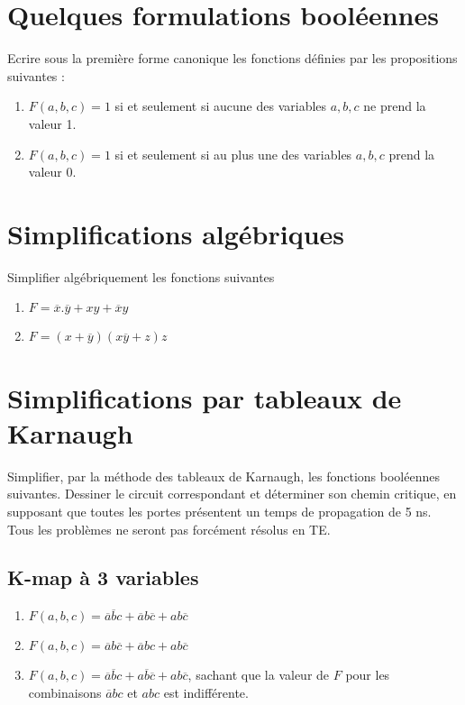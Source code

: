 \documentclass[a4paper,11pt]{article}
\begin{document}
\section{Quelques formulations booléennes}

Ecrire sous la première forme canonique les fonctions définies par les propositions suivantes : 

\begin{enumerate}
\item $F(a,b,c)=1$ si et seulement si aucune des variables $a,b,c$ ne prend la valeur 1.
\item $F(a,b,c)=1$ si et seulement si au plus une des variables $a,b,c$ prend la valeur 0.
\end{enumerate}


\section{Simplifications algébriques}
Simplifier algébriquement les  fonctions suivantes 

\begin{enumerate}
\item $F=\overline{x}.\overline{y} + xy+\overline{x}y$
\item $F=(x+\overline{y})(x\overline{y}+z)z$
\end{enumerate}


\section{Simplifications par tableaux de Karnaugh}
Simplifier, par la méthode des tableaux de Karnaugh, les fonctions booléennes suivantes. Dessiner le circuit correspondant et déterminer son chemin critique, en supposant que toutes les portes présentent un temps de propagation de 5 ns. Tous les problèmes ne seront pas forcément résolus en TE.

\subsection{K-map à 3 variables}
\begin{enumerate}
\item $F(a,b,c)=\overline{a}\overline{b}c+\overline{a}b\overline{c}+ab\overline{c}$
\item $F(a,b,c)=\overline{a}b\overline{c}+\overline{a}bc+ab\overline{c}$
\item $F(a,b,c)=\overline{a}\overline{b}c+a\overline{b}\overline{c}+ab\overline{c}$, sachant que la valeur de $F$ pour les combinaisons $\overline{a}bc$ et $abc$ est indifférente.
\end{enumerate}
\end{document}
